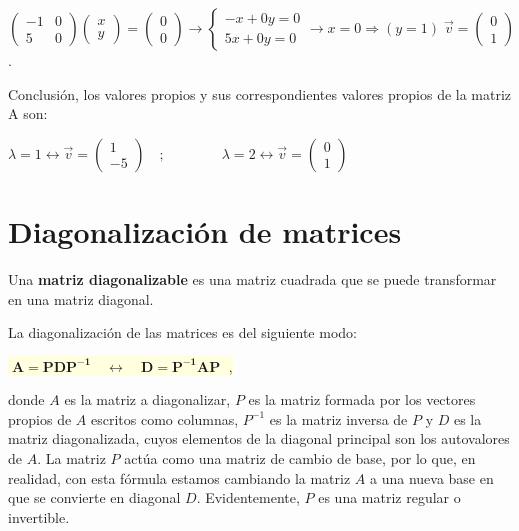 \begin{ejem}
\noindent \small{ $\left( \begin{matrix} -1&0\\5&0 \end{matrix} \right)\left( \begin{matrix} x\\y \end{matrix} \right) = \left( \begin{matrix} 0\\0 \end{matrix} \right) \to \begin{cases} -x+0y=0\\5x+0y=0 \end{cases} \to x=0 \Rightarrow (y=1)\; 
\vec v=\left( \begin{matrix} 0\\1 \end{matrix} \right)$}\normalsize{.}

Conclusión, los valores propios y sus correspondientes valores propios de la matriz A son:

$\lambda=1 \leftrightarrow \vec v=\left( \begin{matrix} 1\\-5 \end{matrix} \right)
\quad; \qquad \qquad  
\lambda = 2 \leftrightarrow \vec v=\left( \begin{matrix} 0\\1 \end{matrix} \right)$
\end{ejem}


\section{Diagonalización de matrices}

\begin{defi}
Una \textbf{matriz diagonalizable} es una matriz cuadrada que se puede transformar en una matriz diagonal.	

La diagonalización de las matrices es del siguiente modo:

\vspace{4mm} \centerline{\colorbox{LightYellow}{$\boxed{ \; \boldsymbol{A=PDP^{-1} \quad \leftrightarrow \quad D=P^{-1}AP}\; }$ ,}}

\justify

donde $A$ es la matriz a diagonalizar, $P$ es la matriz formada por los vectores propios de $A$ escritos como columnas, $P^{-1}$ es la matriz inversa de $P$ y $D$ es la matriz diagonalizada, cuyos elementos de la diagonal principal son los autovalores de $A$. \textcolor{gris}{La matriz $P$ actúa como una matriz de cambio de base, por lo que, en realidad, con esta fórmula estamos cambiando la matriz $A$ a una nueva base en que se convierte en diagonal $D$. Evidentemente, $P$ es una matriz regular o invertible.} 
\end{defi}

